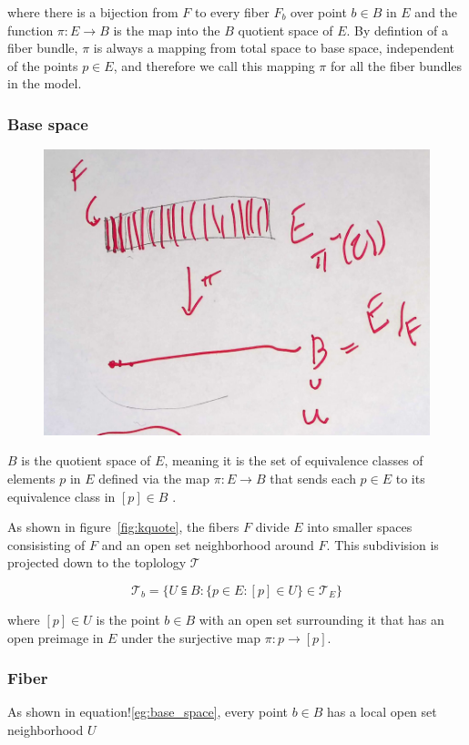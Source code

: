 \documentclass[../main.tex]{subfiles}
\begin{document}
where there is a bijection from $F$ to every fiber $F_b$ over point $b \in B$ in $E$ and the function $\pi: E \rightarrow B$ is the map into the $B$ quotient space of $E$. By defintion of a fiber bundle, $\pi$ is always a mapping from total space to base space, independent of the points $p \in E$, and therefore we call this mapping $\pi$ for all the fiber bundles in the model. 

\subsubsection{Base space}
\begin{figure}[ht]
    \label{fig:base_space}
    \includegraphics[width=0.4\linewidth]{figures/sections/math/k_qspace.png}
\end{figure}

$B$ is the quotient space of $E$, meaning it is the set of equivalence classes of elements $p$ in $E$ defined via the map $\pi: E \rightarrow B$ that sends each $p \in E$ to its equivalence class in $[p] \in B$ \cite{QuotientSpaceTopology2020,QuotientSpaceTopology2020}.

As shown in figure~\ref{fig:kquote}, the fibers $F$ divide $E$ into smaller spaces consisisting of $F$ and an open set neighborhood around $F$. This subdivision is projected down to the toplology $\mathcal{T}$

\begin{equation}
    \label{eq:base_space}
\mathcal{T}_b = \{U\subseteqq B: \{p \in E: [p] \in U\}\in \mathcal{T}_E\}
\end{equation}

where $[p] \in U$ is the point $b \in B$ with an open set surrounding it that has an open preimage in $E$ under the surjective map $\pi: p \rightarrow [p]$. 

\subsubsection{Fiber}
As shown in equation!\ref{eg:base_space}, every point $b \in B$ has a local open set neighborhood $U$ \cite{FiberBundle2020, rowlandFiberBundle}
\end{document}
